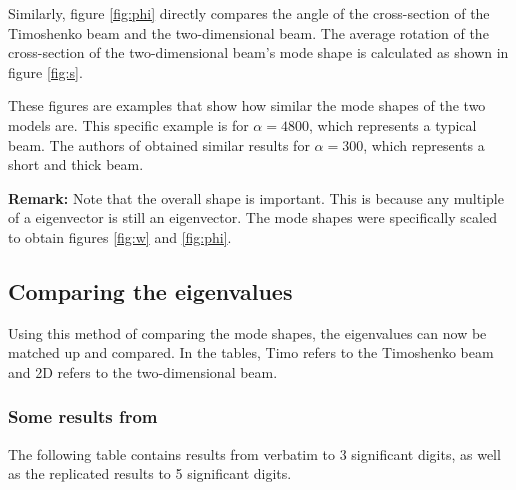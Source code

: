 	Similarly, figure \ref{fig:phi} directly compares the angle of the cross-section of the Timoshenko beam and the two-dimensional beam. The average rotation of the cross-section of the two-dimensional beam's mode shape is calculated as shown in figure \ref{fig:s}.

	\FloatBarrier
	\begin{figure}[ht!]
	\end{figure}
	\FloatBarrier

	These figures are examples that show how similar the mode shapes of the two models are. This specific example is for $\alpha = 4800$, which represents a typical beam. The authors of \cite{LVV09} obtained similar results for $\alpha=300$, which represents a short and thick beam.

	\textbf{Remark:} Note that the overall shape is important. This is because any multiple of a eigenvector is still an eigenvector. The mode shapes were specifically scaled to obtain figures \ref{fig:w} and \ref{fig:phi}.

	\subsection*{Comparing the eigenvalues}
	Using this method of comparing the mode shapes, the eigenvalues can now be matched up and compared. In the tables, Timo refers to the Timoshenko beam and 2D refers to the two-dimensional beam.

	\subsubsection*{Some results from \cite{LVV09}}
	The following table contains results from \cite{LVV09} verbatim to 3 significant digits, as well as the replicated results to 5 significant digits.


